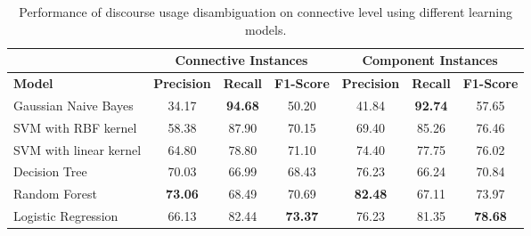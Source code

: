 \begin{table}[ht]
\centering
\begin{tabular}{|l|c|c|c|c|c|c|}
\hline
                            & \multicolumn{3}{c|}{Connective Instances} & \multicolumn{3}{c|}{Component Instances}  \\ \hline
\bf Model                   & \bf Precision & \bf Recall & \bf F1-Score  & \bf Precision & \bf Recall & \bf F1-Score \\ \hline
    Gaussian Naive Bayes    &     34.17     & \bf 94.68  &     50.20     &     41.84     & \bf 92.74  &     57.65    \\ \hline
    SVM with RBF kernel     &     58.38     &     87.90  &     70.15     &     69.40     &     85.26  &     76.46    \\ \hline
    SVM with linear kernel  &     64.80     &     78.80  &     71.10     &     74.40     &     77.75  &     76.02    \\ \hline
    Decision Tree           &     70.03     &     66.99  &     68.43     &     76.23     &     66.24  &     70.84    \\ \hline
    Random Forest           & \bf 73.06     &     68.49  &     70.69     & \bf 82.48     &     67.11  &     73.97    \\ \hline
    Logistic Regression     &     66.13     &     82.44  & \bf 73.37     &     76.23     &     81.35  & \bf 78.68    \\ \hline

\end{tabular}
\caption{\label{t:recognition-connective-models} Performance of discourse usage
disambiguation on connective level using different learning models. }
\end{table}

